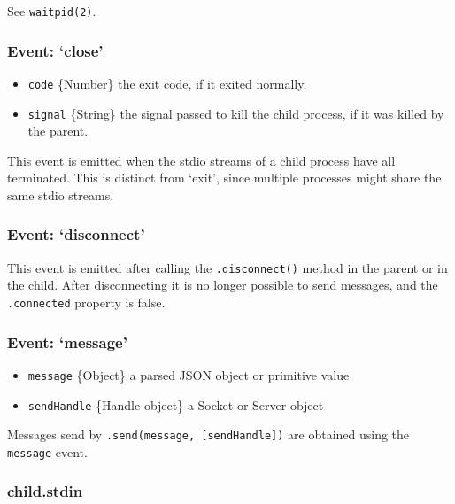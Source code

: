 See \texttt{waitpid(2)}.

\subsubsection{\texorpdfstring{Event:
`close'}{Event: close}}\label{event-close}

\begin{itemize}
\itemsep1pt\parskip0pt
\item
  \texttt{code} \{Number\} the exit code, if it exited normally.
\item
  \texttt{signal} \{String\} the signal passed to kill the child
  process, if it was killed by the parent.
\end{itemize}

This event is emitted when the stdio streams of a child process have all
terminated. This is distinct from `exit', since multiple processes might
share the same stdio streams.

\subsubsection{\texorpdfstring{Event:
`disconnect'}{Event: disconnect}}\label{event-disconnect}

This event is emitted after calling the \texttt{.disconnect()} method in
the parent or in the child. After disconnecting it is no longer possible
to send messages, and the \texttt{.connected} property is false.

\subsubsection{\texorpdfstring{Event:
`message'}{Event: message}}\label{event-message}

\begin{itemize}
\itemsep1pt\parskip0pt
\item
  \texttt{message} \{Object\} a parsed JSON object or primitive value
\item
  \texttt{sendHandle} \{Handle object\} a Socket or Server object
\end{itemize}

Messages send by \texttt{.send(message,\ {[}sendHandle{]})} are obtained
using the \texttt{message} event.

\subsubsection{child.stdin}\label{child.stdin}

